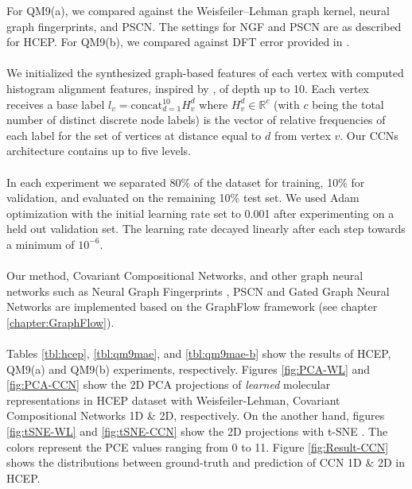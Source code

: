 \documentclass[sigchi]{acmart}
\theoremstyle{definition}
\theoremstyle{theorem}
\theoremstyle{corollary}
\theoremstyle{lemma}
\theoremstyle{remark}
\theoremstyle{prop}
\begin{document}
For QM9(a), we compared against the Weisfeiler--Lehman graph kernel, neural graph fingerprints, and PSCN. The settings for NGF and PSCN are as described for HCEP. For QM9(b), we compared against DFT error provided in \citep{Faber2017}. \\ \\
We initialized the synthesized graph-based features of each vertex with computed histogram alignment features, inspired by \citep{Kriege16}, of depth up to 10. Each vertex receives a base label $l_v= \text{concat}_{d = 1}^{10} {H_v^d}$ where $H_v^d \in \mathbb{R}^c$ (with $c$ being the total number of distinct discrete node labels) is the vector of relative frequencies of each label for the set of vertices at distance equal to $d$ from vertex $v$. Our CCNs architecture contains up to five levels. \\ \\
In each experiment we separated 80\% of the dataset for training, 10\% for validation, and evaluated on the remaining 10\% test set. We used Adam optimization \citep{Kingma2015} with the initial learning rate set to 0.001 after experimenting on a held out validation set. The learning rate decayed linearly after each step towards a minimum of $10^{-6}$. \\ \\
Our method, Covariant Compositional Networks, and other graph neural networks such as Neural Graph Fingerprints \citep{Duvenaud2015}, PSCN \citep{Niepert2016} and Gated Graph Neural Networks \citep{LiZemel2015} are implemented based on the GraphFlow framework (see chapter \ref{chapter:GraphFlow}). \\ \\
Tables \ref{tbl:hcep}, \ref{tbl:qm9mae}, and \ref{tbl:qm9mae-b} show the results of HCEP, QM9(a) and QM9(b) experiments, respectively. Figures \ref{fig:PCA-WL} and \ref{fig:PCA-CCN} show the 2D PCA projections of \textit{learned} molecular representations in HCEP dataset with Weisfeiler-Lehman, Covariant Compositional Networks 1D \& 2D, respectively. On the another hand, figures \ref{fig:tSNE-WL} and \ref{fig:tSNE-CCN} show the 2D projections with t-SNE \citep{Maaten2008}. The colors represent the PCE values ranging from 0 to 11. Figure \ref{fig:Result-CCN} shows the distributions between ground-truth and prediction of CCN 1D \& 2D in HCEP.
\end{document}
